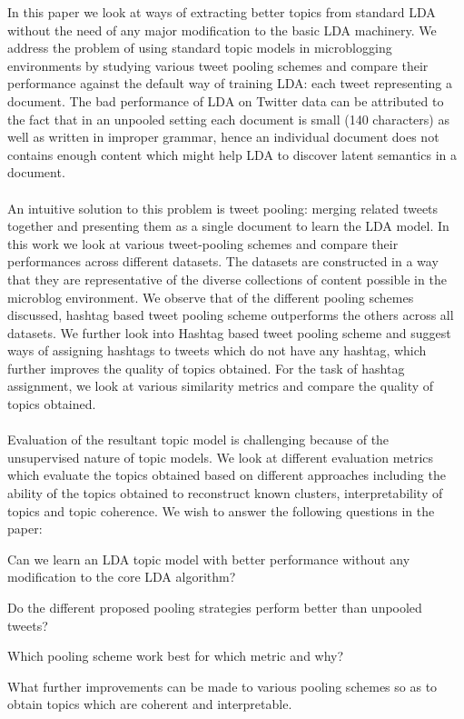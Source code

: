 \documentclass[10pt,a5paper,twoside]{article}
\begin{document}
In this paper we look at ways of extracting better topics from standard LDA without the need of any major modification to the basic LDA machinery. We address the problem of using standard topic models in microblogging environments by studying various tweet pooling schemes and compare their performance against the default way of training LDA: each tweet representing a document. The bad performance of LDA on Twitter data can be attributed to the fact that in an unpooled setting each document is small (140 characters) as well as written in improper grammar, hence an individual document does not contains enough content which might help LDA to discover latent semantics in a document.
\\\\
An intuitive solution to this problem is tweet pooling: merging related tweets together and presenting them as a single document to learn the LDA model. In this work we look at various tweet-pooling schemes and compare their performances across different datasets. The datasets are constructed in a way that they are representative of the diverse collections of content possible in the microblog environment. %
We observe that of the different pooling schemes discussed, hashtag based tweet pooling scheme outperforms the others across all datasets. We further look into Hashtag based tweet pooling scheme and suggest ways of assigning hashtags to tweets which do not have any hashtag, which further improves the quality of topics obtained. For the task of hashtag assignment, we look at various similarity metrics and compare the quality of topics obtained.
\\\\
Evaluation of the resultant topic model is challenging because of the unsupervised nature of topic models. We look at different evaluation metrics which evaluate the topics obtained based on different approaches including the ability of the topics obtained to reconstruct known clusters, interpretability of topics and topic coherence. We wish to answer the following questions in the paper:
\begin{compactitem}
\item  Can we learn an LDA topic model with better performance without any modification to the core LDA algorithm?
\item Do the different proposed pooling strategies perform better than unpooled tweets?
\item Which pooling scheme work best for which metric and why?
\item What further improvements can be made to various pooling schemes so as to obtain topics which are coherent and interpretable.
\end{compactitem}
\end{document}
